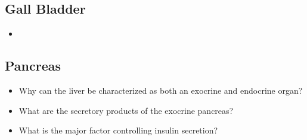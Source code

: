 \begin{itemize}
  \subsection{Gall Bladder}\label{Gall Bladder}
  \begin{multicols}{2}
  \begin{itemize}
    \item 
  \end{itemize}
  \end{multicols}
  
  \subsection{Pancreas}\label{Pancreas}
  \begin{multicols}{2}
  \begin{itemize}
    \item Why can the liver be characterized as both an exocrine and endocrine organ?
    \item What are the secretory products of the exocrine pancreas?
    \item What is the major factor controlling insulin secretion?
  \end{itemize}
  \end{multicols}

\end{itemize}
